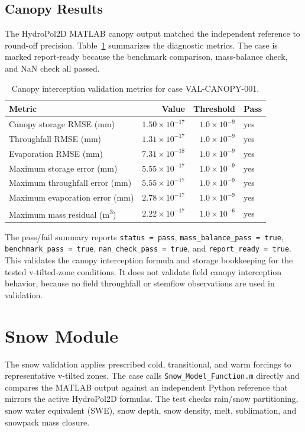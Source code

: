 \documentclass[11pt]{article}
\begin{document}
\subsection{Canopy Results}
\label{sec:canopy-results}
The HydroPol2D MATLAB canopy output matched the independent reference to round-off precision. Table~\ref{tab:canopy-results} summarizes the diagnostic metrics. The case is marked report-ready because the benchmark comparison, mass-balance check, and NaN check all passed.

\begin{table}[htbp]
\centering
\caption{Canopy interception validation metrics for case VAL-CANOPY-001.}
\label{tab:canopy-results}
\begin{tabular}{lrrl}
\toprule
Metric & Value & Threshold & Pass \\
\midrule
Canopy storage RMSE (mm) & $1.50\times10^{-17}$ & $1.0\times10^{-9}$ & yes \\
Throughfall RMSE (mm) & $1.31\times10^{-17}$ & $1.0\times10^{-9}$ & yes \\
Evaporation RMSE (mm) & $7.31\times10^{-18}$ & $1.0\times10^{-9}$ & yes \\
Maximum storage error (mm) & $5.55\times10^{-17}$ & $1.0\times10^{-9}$ & yes \\
Maximum throughfall error (mm) & $5.55\times10^{-17}$ & $1.0\times10^{-9}$ & yes \\
Maximum evaporation error (mm) & $2.78\times10^{-17}$ & $1.0\times10^{-9}$ & yes \\
Maximum mass residual (\si{\cubic\meter}) & $2.22\times10^{-17}$ & $1.0\times10^{-6}$ & yes \\
\bottomrule
\end{tabular}
\end{table}

The pass/fail summary reports \texttt{status = pass}, \texttt{mass\_balance\_pass = true}, \texttt{benchmark\_pass = true}, \texttt{nan\_check\_pass = true}, and \texttt{report\_ready = true}. This validates the canopy interception formula and storage bookkeeping for the tested v-tilted-zone conditions. It does not validate field canopy interception behavior, because no field throughfall or stemflow observations are used in validation.

\section{Snow Module}
\label{sec:snow}
The snow validation applies prescribed cold, transitional, and warm forcings to representative v-tilted zones. The case calls \texttt{Snow\_Model\_Function.m} directly and compares the MATLAB output against an independent Python reference that mirrors the active HydroPol2D formulas. The test checks rain/snow partitioning, snow water equivalent (SWE), snow depth, snow density, melt, sublimation, and snowpack mass closure.
\end{document}
